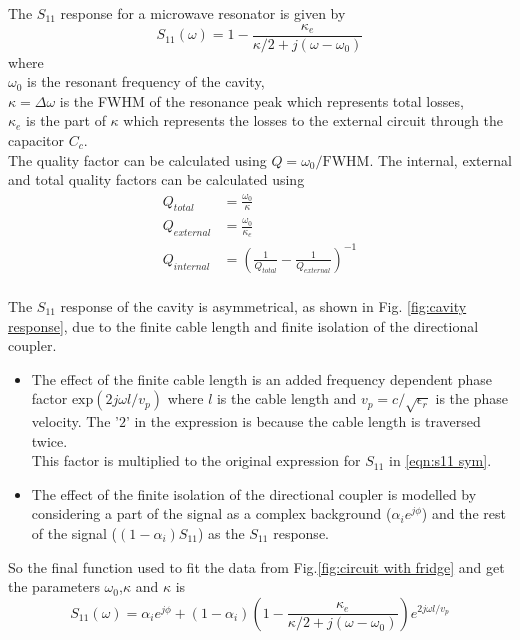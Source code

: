 The $S_{11}$ response for a microwave resonator is given by \cite{Aspelmeyer2014}
\begin{equation}
S_{11}(\omega) = 1-\frac{\kappa_e}{\kappa/2+j(\omega-\omega_0)}
\label{eqn:s11 sym}
\end{equation}
where\\
$\omega_0$ is the resonant frequency of the cavity,\\
$\kappa = \Delta\omega$ is the FWHM of the resonance peak which represents total losses,\\
$\kappa_e$ is the part of $\kappa$ which represents the losses to the external circuit through the capacitor $C_c$.\\
The quality factor can be calculated using $Q = \omega_0/\text{FWHM}$. The internal, external and total quality factors can be calculated using
\begin{align}
Q_{total} &= \frac{\omega_0}{\kappa}\\
Q_{external} &= \frac{\omega_0}{\kappa_e}\\
Q_{internal} &= \left(\frac{1}{Q_{total}}-\frac{1}{Q_{external}}\right)^{-1}\\
\end{align}

The $S_{11}$ response of the cavity is asymmetrical, as shown in Fig. \ref{fig:cavity response}, due to the finite cable length and finite isolation of the directional coupler.
\begin{itemize}
\item The effect of the finite cable length is an added frequency dependent phase factor $\text{exp}(2j\omega l/v_p)$ where $l$ is the cable length and $v_p=c/\sqrt{\epsilon_r}$ is the phase velocity. The '$2$' in the expression is because the cable length is traversed twice.\\
This factor is multiplied to the original expression for $S_{11}$ in \ref{eqn:s11 sym}.
\item The effect of the finite isolation of the directional coupler is modelled by considering a part of the signal as a complex background ($\alpha_i e^{j\phi}$) and the rest of the signal ($(1-\alpha_i)S_{11}$) as the $S_{11}$ response.
\end{itemize}
So the final function used to fit the data from Fig.\ref{fig:circuit with fridge} and get the parameters $\omega_0$,$\kappa$ and $\kappa$ is
\begin{equation}
S_{11}(\omega) = \alpha_i e^{j\phi}+(1-\alpha_i)\left(1-\frac{\kappa_e}{\kappa/2+j(\omega-\omega_0)}\right)e^{2j\omega l/v_p}
\end{equation}

